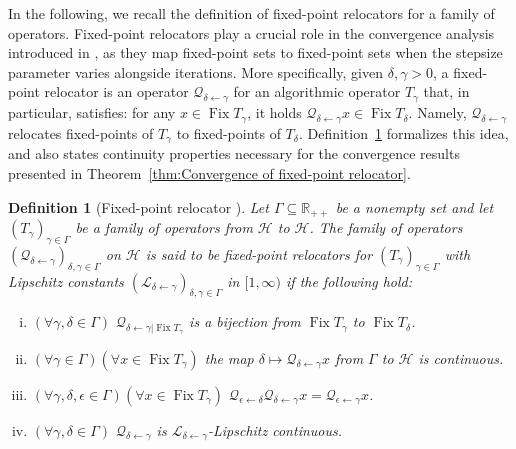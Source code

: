 \documentclass[a4paper,12pt]{article}
\newtheorem{definition}[theorem]{Definition}
\DeclareMathOperator{\Fix}{Fix}
\begin{document}
In the following, we recall the definition of fixed-point relocators for a family of operators. Fixed-point relocators play a crucial role in the convergence analysis introduced in \cite{atenas2025relocated}, as they map fixed-point sets to fixed-point sets when the stepsize parameter varies alongside iterations. More specifically, given $\delta,\gamma >0$, a fixed-point relocator is an operator $\mathcal{Q}_{\delta\gets\gamma}$ for an algorithmic operator $T_\gamma$ that, in particular,  satisfies:  for any $x \in \Fix T_\gamma$, it holds $\mathcal{Q}_{\delta\gets\gamma}x \in \Fix T_\delta$. Namely, $\mathcal{Q}_{\delta\gets\gamma}$ relocates fixed-points of $T_\gamma$ to fixed-points of $T_\delta$. Definition~\ref{def: fixed-point relocator} formalizes this idea, and also states continuity properties necessary for the convergence results presented in Theorem~\ref{thm:Convergence of fixed-point relocator}.
\begin{definition}[{Fixed-point relocator \cite[Definition~4.1]{atenas2025relocated}}]\label{def: fixed-point relocator}
    Let $\Gamma\subseteq\mathbb{R}_{++}$ be a nonempty set and let $(T_{\gamma})_{\gamma\in\Gamma}$ be a family of operators from $\mathcal{H}$ to $\mathcal{H}$. The family of operators $(\mathcal{Q}_{\delta\leftarrow\gamma})_{\delta,\gamma\in\Gamma}$ on $\mathcal{H}$ is said to be \emph{fixed-point relocators} for $(T_{\gamma})_{\gamma\in\Gamma}$ with Lipschitz constants $(\mathcal{L_{\delta\leftarrow\gamma}})_{\delta,\gamma\in\Gamma}$ in $[1,\infty)$ if the following hold:
\begin{enumerate}[(i)]
    \item\label{def i} $(\forall \gamma,\delta\in\Gamma)$ $\mathcal{Q}_{\delta\leftarrow\gamma|\Fix T_\gamma}$ is a bijection from $\Fix T_\gamma$ to $\Fix T_\delta$.
    \item\label{def ii} $(\forall \gamma\in\Gamma)(\forall x\in\Fix T_{\gamma})$ the map $\delta\mapsto\mathcal{Q}_{\delta\leftarrow\gamma}x$ from $\Gamma$ to $\mathcal{H}$ is continuous.
    \item\label{def iii} $(\forall \gamma,\delta,\epsilon\in\Gamma)(\forall x\in\Fix T_{\gamma})$ $\mathcal{Q}_{\epsilon\leftarrow\delta}\mathcal{Q}_{\delta\leftarrow\gamma}x=\mathcal{Q_{\epsilon\leftarrow\gamma}}x$.
    \item\label{def iv} $(\forall \gamma,\delta\in\Gamma)$ $\mathcal{Q}_{\delta\leftarrow\gamma}$ is $\mathcal{L_{\delta\leftarrow\gamma}}$-Lipschitz continuous.
\end{enumerate}
\end{definition}
\end{document}
